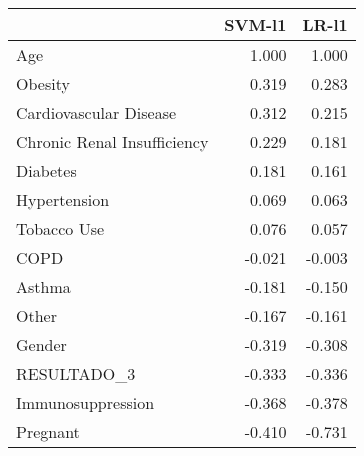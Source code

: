 \begin{tabular}{lrr}
\toprule
{} &  SVM-l1 &  LR-l1 \\
\midrule
Age                         &   1.000 &  1.000 \\
Obesity                     &   0.319 &  0.283 \\
Cardiovascular Disease      &   0.312 &  0.215 \\
Chronic Renal Insufficiency &   0.229 &  0.181 \\
Diabetes                    &   0.181 &  0.161 \\
Hypertension                &   0.069 &  0.063 \\
Tobacco Use                 &   0.076 &  0.057 \\
COPD                        &  -0.021 & -0.003 \\
Asthma                      &  -0.181 & -0.150 \\
Other                       &  -0.167 & -0.161 \\
Gender                      &  -0.319 & -0.308 \\
RESULTADO\_3                 &  -0.333 & -0.336 \\
Immunosuppression           &  -0.368 & -0.378 \\
Pregnant                    &  -0.410 & -0.731 \\
\bottomrule
\end{tabular}
